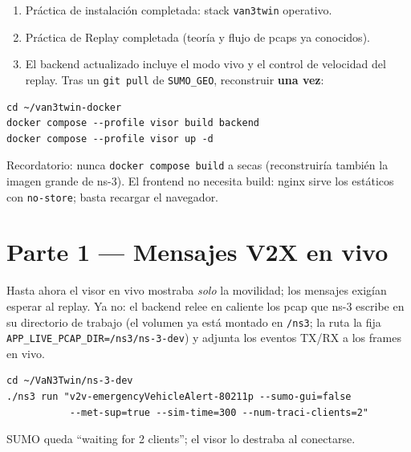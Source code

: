 \documentclass[11pt,a4paper]{article}
\begin{document}
\begin{enumerate}[leftmargin=1.6em, itemsep=2pt]
  \item Práctica de instalación completada: stack \texttt{van3twin} operativo.
  \item Práctica de Replay completada (teoría y flujo de pcaps ya conocidos).
  \item El backend actualizado incluye el modo vivo y el control de velocidad
        del replay. Tras un \texttt{git pull} de \texttt{SUMO\_GEO}, reconstruir
        \textbf{una vez}:
\end{enumerate}

\begin{enmac}
\begin{lstlisting}
cd ~/van3twin-docker
docker compose --profile visor build backend
docker compose --profile visor up -d
\end{lstlisting}
Recordatorio: nunca \texttt{docker compose build} a secas (reconstruiría
también la imagen grande de ns-3). El frontend no necesita build: nginx sirve
los estáticos con \texttt{no-store}; basta recargar el navegador.
\end{enmac}

\section{Parte 1 --- Mensajes V2X en vivo}

Hasta ahora el visor en vivo mostraba \emph{solo} la movilidad; los mensajes
exigían esperar al replay. Ya no: el backend relee en caliente los pcap que
ns-3 escribe en su directorio de trabajo (el volumen ya está montado en
\texttt{/ns3}; la ruta la fija \texttt{APP\_LIVE\_PCAP\_DIR=/ns3/ns-3-dev}) y
adjunta los eventos TX/RX a los frames en vivo.

\begin{encontenedor}
\begin{lstlisting}
cd ~/VaN3Twin/ns-3-dev
./ns3 run "v2v-emergencyVehicleAlert-80211p --sumo-gui=false
           --met-sup=true --sim-time=300 --num-traci-clients=2"
\end{lstlisting}
SUMO queda ``waiting for 2 clients''; el visor lo destraba al conectarse.
\end{encontenedor}
\end{document}
